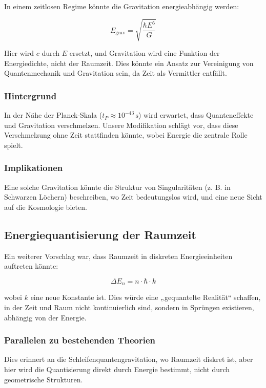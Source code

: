 \documentclass{article}
\begin{document}
	In einem zeitlosen Regime könnte die Gravitation energieabhängig werden:
	
	\[
	E_{\text{grav}} = \sqrt{\frac{\hbar E^5}{G}}
	\]
	
	Hier wird \( c \) durch \( E \) ersetzt, und Gravitation wird eine Funktion der Energiedichte, nicht der Raumzeit. Dies könnte ein Ansatz zur Vereinigung von Quantenmechanik und Gravitation sein, da Zeit als Vermittler entfällt.
	
	\subsubsection{Hintergrund}
	
	In der Nähe der Planck-Skala (\( t_P \approx 10^{-43} \, \text{s} \)) wird erwartet, dass Quanteneffekte und Gravitation verschmelzen. Unsere Modifikation schlägt vor, dass diese Verschmelzung ohne Zeit stattfinden könnte, wobei Energie die zentrale Rolle spielt.
	
	\subsubsection{Implikationen}
	
	Eine solche Gravitation könnte die Struktur von Singularitäten (z. B. in Schwarzen Löchern) beschreiben, wo Zeit bedeutungslos wird, und eine neue Sicht auf die Kosmologie bieten.
	
	\subsection{Energiequantisierung der Raumzeit}
	
	Ein weiterer Vorschlag war, dass Raumzeit in diskreten Energieeinheiten auftreten könnte:
	
	\[
	\Delta E_n = n \cdot \hbar \cdot k
	\]
	
	wobei \( k \) eine neue Konstante ist. Dies würde eine „gequantelte Realität“ schaffen, in der Zeit und Raum nicht kontinuierlich sind, sondern in Sprüngen existieren, abhängig von der Energie.
	
	\subsubsection{Parallelen zu bestehenden Theorien}
	
	Dies erinnert an die Schleifenquantengravitation, wo Raumzeit diskret ist, aber hier wird die Quantisierung direkt durch Energie bestimmt, nicht durch geometrische Strukturen.
	
\end{document}
